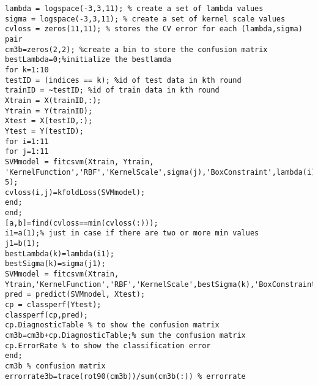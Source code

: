 \documentclass[11pt]{scrartcl}
\begin{document}
\begin{lstlisting}[keywordstyle=\color{blue!70},commentstyle=\color{red!50!green!50!blue!50},frame=shadowbox, rulesepcolor=\color{red!20!green!20!blue!20}]
%%%%%--------------------------------------------------------------------------------------
lambda = logspace(-3,3,11); % create a set of lambda values
sigma = logspace(-3,3,11); % create a set of kernel scale values
cvloss = zeros(11,11); % stores the CV error for each (lambda,sigma) pair
cm3b=zeros(2,2); %create a bin to store the confusion matrix
bestLambda=0;%initialize the bestlamda
for k=1:10
testID = (indices == k); %id of test data in kth round
trainID = ~testID; %id of train data in kth round
Xtrain = X(trainID,:);
Ytrain = Y(trainID);
Xtest = X(testID,:);
Ytest = Y(testID);
for i=1:11
for j=1:11
SVMmodel = fitcsvm(Xtrain, Ytrain, 'KernelFunction','RBF','KernelScale',sigma(j),'BoxConstraint',lambda(i),'Kfold', 5);
cvloss(i,j)=kfoldLoss(SVMmodel);
end;
end;
[a,b]=find(cvloss==min(cvloss(:)));
i1=a(1);% just in case if there are two or more min values
j1=b(1);
bestLambda(k)=lambda(i1);
bestSigma(k)=sigma(j1);
SVMmodel = fitcsvm(Xtrain, Ytrain,'KernelFunction','RBF','KernelScale',bestSigma(k),'BoxConstraint',bestLambda(k));
pred = predict(SVMmodel, Xtest);
cp = classperf(Ytest);
classperf(cp,pred);
cp.DiagnosticTable % to show the confusion matrix
cm3b=cm3b+cp.DiagnosticTable;% sum the confusion matrix
cp.ErrorRate % to show the classification error
end;
cm3b % confusion matrix
errorrate3b=trace(rot90(cm3b))/sum(cm3b(:)) % errorrate
\end{lstlisting} 
\end{document}
